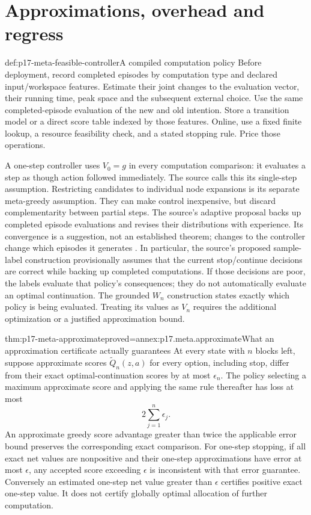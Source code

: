 \section{Approximations, overhead and regress}
\label{sec:p17-meta-approximation}

\begin{hbmethod}{def:p17-meta-feasible-controller}{A compiled computation policy}
Before deployment, record completed episodes by computation type and
declared input/workspace features. Estimate their joint changes to the
evaluation vector, their running time, peak space and the subsequent
external choice. Use the same completed-episode evaluation of the new
and old intention. Store a transition model or a direct score table
indexed by those features. Online, use a fixed finite lookup, a resource
feasibility check, and a stated stopping rule. Price those operations.

A one-step controller uses \(V_0=g\) in every computation comparison:
it evaluates a step as though action followed immediately. The source
calls this its single-step assumption. Restricting candidates to individual
node expansions is its separate meta-greedy assumption. They can make
control inexpensive, but discard complementarity between partial steps.
The source's adaptive proposal backs up completed episode evaluations
and revises their distributions with experience. Its convergence is a
suggestion, not an established theorem; changes to the controller change
which episodes it generates \cite[\S\S4.2, 4.5--5]{RussellWefald1989KRMetareasoning}.
In particular, the source's proposed sample-label construction provisionally
assumes that the current stop/continue decisions are correct while backing
up completed computations. If those decisions are poor, the labels evaluate
that policy's consequences; they do not automatically evaluate an optimal
continuation. The grounded \(W_n\) construction states exactly which
policy is being evaluated. Treating its values as \(V_n\) requires
the additional optimization or a justified approximation bound.
\end{hbmethod}

\begin{hbtheorem}{thm:p17-meta-approximate}{proved=annex:p17.meta.approximate}{What an approximation certificate actually guarantees}
At every state with \(n\) blocks left, suppose approximate scores
\(\widetilde Q_n(z,a)\) for every option, including stop, differ
from their exact optimal-continuation scores by at most \(\epsilon_n\).
The policy selecting a maximum approximate score and applying the same
rule thereafter has loss at most
\[
                         2\sum_{j=1}^n\epsilon_j.
\]
An approximate greedy score advantage greater than twice the applicable
error bound preserves the corresponding exact comparison.
For one-step stopping, if all exact net values are nonpositive and
their one-step approximations have error at most \(\epsilon\),
any accepted score exceeding \(\epsilon\) is inconsistent with
that error guarantee. Conversely an estimated one-step net value
greater than \(\epsilon\) certifies positive exact one-step value.
It does not certify globally optimal allocation of further computation.
\end{hbtheorem}

